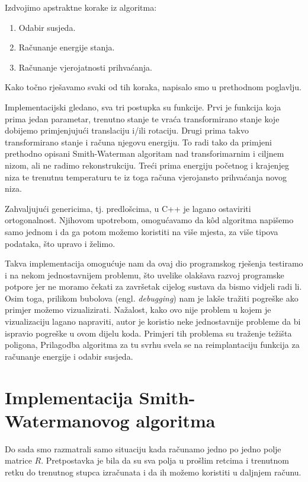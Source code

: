 \documentclass[times, utf8, zavrsni]{fer}
\begin{document}
Izdvojimo apstraktne korake iz algoritma:
\begin{enumerate}
\item 
Odabir susjeda.

\item
Računanje energije stanja.

\item
Računanje vjerojatnosti prihvaćanja.
\end{enumerate}
Kako točno rješavamo svaki od tih koraka, napisalo smo u
prethodnom poglavlju. 

Implementacijski gledano, sva tri postupka su funkcije.
Prvi je funkcija koja prima jedan parametar, trenutno stanje
te vraća transformirano stanje koje dobijemo primjenjujući
translaciju i/ili rotaciju.
Drugi prima takvo transformirano stanje i računa njegovu
energiju. To radi tako da primjeni prethodno opisani
Smith-Waterman algoritam nad transforimarnim i ciljnem
nizom, ali ne radimo rekonstrukciju. 
Treći prima energiju početnog i krajenjeg niza te trenutnu
temperaturu te iz toga računa vjerojansto prihvaćanja
novog niza. 

Zahvaljujući genericima, tj. predlošcima, u C++ je lagano
ostaviriti ortogonalnost. Njihovom upotrebom, omogućavamo
da kôd algoritma napišemo samo jednom i da ga potom možemo
koristiti na više mjesta, za više tipova podataka,
što upravo i želimo. 

Takva implementacija omogućuje nam da ovaj dio programskog
rješenja testiramo i na nekom jednostavnijem problemu, što
uvelike olakšava razvoj programske potpore jer ne moramo
čekati za završetak cijelog sustava da bismo vidjeli radi li.
Osim toga, prilikom bubolova (engl. \textit{debugging}) nam
je lakše tražiti pogreške ako primjer možemo vizualizirati.
Nažalost, kako ovo nije problem u kojem je vizualizaciju
lagano napraviti, autor je koristio neke jednostavnije
probleme da bi ispravio pogreške u ovom dijelu koda. Primjeri
tih problema su traženje težišta poligona, %
Prilagodba algoritma za tu svrhu svela se na reimplantaciju
funkcija za računanje energije i odabir susjeda. 


\section{Implementacija Smith-Watermanovog algoritma}
Do sada smo razmatrali samo situaciju kada računamo jedno
po jedno polje matrice $R$. Pretpostavka je bila da su 
sva polja u prošlim retcima i trenutnom retku do trenutnog
stupca izračunata i da ih možemo koristiti u daljnjem
računu. 
\end{document}
